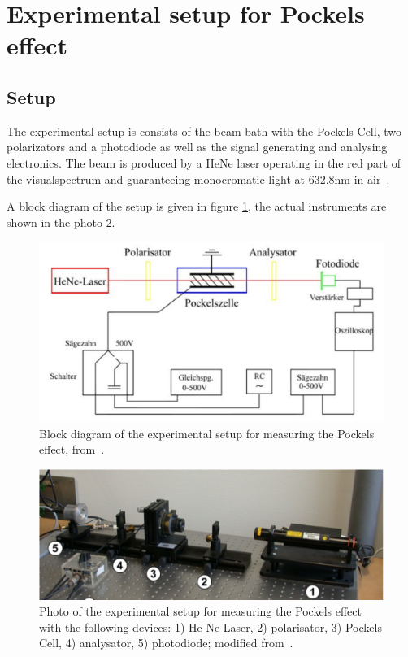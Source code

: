 \section{Experimental setup for Pockels effect}
\subsection{Setup}
\label{sec:setup_pockels}
The experimental setup is consists of the beam bath with the Pockels Cell, 
two polarizators and a photodiode as well as the signal generating and 
analysing electronics. The beam is produced by a HeNe laser operating in 
the red part of the visualspectrum and guaranteeing monocromatic light 
at 632.8nm in air~\cite{versuchsanleitung}. 

A block diagram of the setup is given in figure \ref{fig:setup_block}, 
the actual instruments are shown in the photo \ref{fig:setup_photo}. 

\begin{figure}
\includegraphics[width=\pltw]{figures/setup_block.pdf}
\caption{
    Block diagram of the experimental setup for measuring the 
    Pockels effect, 
    from~\cite{versuchsanleitung}.
    }
\label{fig:setup_block}
\end{figure}

\begin{figure}
\includegraphics[width=\textwidth]{figures/setup_photo.pdf}
\caption{
    Photo of the experimental setup for measuring the 
    Pockels effect with the following devices:
    1) He-Ne-Laser, 2) polarisator, 3) Pockels Cell, 
    4) analysator, 5) photodiode;
    modified from~\cite{versuchsanleitung}.
    }
\label{fig:setup_photo}
\end{figure}

